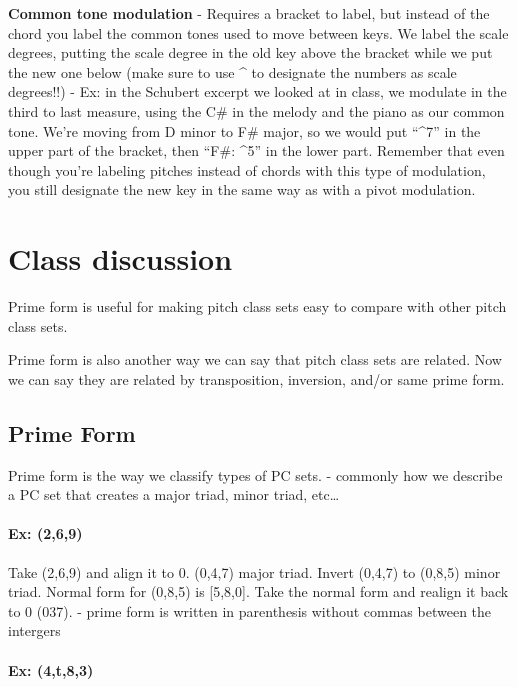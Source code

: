 \documentclass{book}
\begin{document}
\textbf{Common tone modulation} - Requires a bracket to label, but instead of
the chord you label the common tones used to move between keys. We label the
scale degrees, putting the scale degree in the old key above the bracket while
we put the new one below (make sure to use \^{} to designate the numbers as
scale degrees!!) - Ex: in the Schubert excerpt we looked at in class, we
modulate in the third to last measure, using the C\# in the melody and the
piano as our common tone. We're moving from D minor to F\# major, so we would
put ``\^{}7'' in the upper part of the bracket, then ``F\#: \^{}5'' in the
lower part. Remember that even though you're labeling pitches instead of
chords with this type of modulation, you still designate the new key in the
same way as with a pivot modulation.

\hypertarget{class-discussion-56}{%
\chapter{Class discussion}\label{class-discussion-56}}

Prime form is useful for making pitch class sets easy to compare with other
pitch class sets.

Prime form is also another way we can say that pitch class sets are related.
Now we can say they are related by transposition, inversion, and/or same prime
form.

\hypertarget{prime-form-1}{%
\section{Prime Form}\label{prime-form-1}}

Prime form is the way we classify types of PC sets. - commonly how we describe
a PC set that creates a major triad, minor triad, etc\ldots{}

\hypertarget{ex-269}{%
\subsubsection{Ex: (2,6,9)}\label{ex-269}}

Take (2,6,9) and align it to 0. (0,4,7) major triad. Invert (0,4,7) to (0,8,5)
minor triad. Normal form for (0,8,5) is {[}5,8,0{]}. Take the normal form and
realign it back to 0 (037). - prime form is written in parenthesis without
commas between the intergers

\hypertarget{ex-4t83}{%
\subsubsection{Ex: (4,t,8,3)}\label{ex-4t83}}
\end{document}
